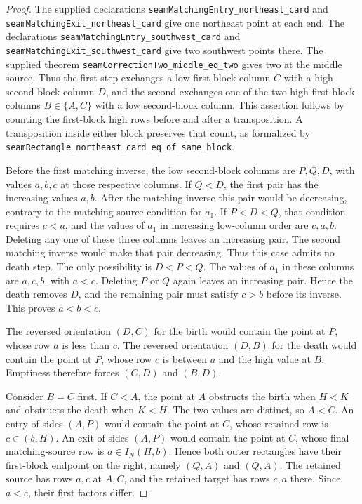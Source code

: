 \documentclass[11pt,oneside]{report}
\theoremstyle{definition}
\numberwithin{equation}{section}
\newcommand{\decl}[1]{\textnormal{\nolinkurl{#1}}}
\begin{document}
\begin{proof}
The supplied declarations \decl{seamMatchingEntry_northeast_card} and
\decl{seamMatchingExit_northeast_card} give one northeast point at
each end. The declarations \decl{seamMatchingEntry_southwest_card}
and \decl{seamMatchingExit_southwest_card} give two southwest
points there. The supplied theorem
\decl{seamCorrectionTwo_middle_eq_two} gives two at the middle source.
Thus the first step exchanges a low first-block column $C$ with a high
second-block column $D$, and the second exchanges one of the two high
first-block columns $B\in\{A,C\}$ with a low second-block column.
This assertion follows by counting the first-block high rows before
and after a transposition. A transposition inside either block preserves
that count, as formalized by
\decl{seamRectangle_northeast_card_eq_of_same_block}.

Before the first matching inverse, the low second-block columns are
$P,Q,D$, with values $a,b,c$ at those respective columns.
If $Q<D$, the first pair has the increasing values $a,b$. After the
matching inverse this pair would be decreasing, contrary to the
matching-source condition for $a_1$.
If $P<D<Q$, that condition requires $c<a$, and the values of $a_1$
in increasing low-column order are $c,a,b$. Deleting any one of these
three columns leaves an increasing pair. The second matching inverse
would make that pair decreasing. Thus this case admits no death step.
The only possibility is $D<P<Q$. The values of $a_1$ in these columns
are $a,c,b$, with $a<c$. Deleting $P$ or $Q$ again leaves an increasing
pair. Hence the death removes $D$, and the remaining pair must satisfy
$c>b$ before its inverse. This proves $a<b<c$.

The reversed orientation $(D,C)$ for the birth would contain the
point at $P$, whose row $a$ is less than $c$. The reversed orientation
$(D,B)$ for the death would contain the point at $P$, whose row $c$
is between $a$ and the high value at $B$. Emptiness therefore forces
$(C,D)$ and $(B,D)$.

Consider $B=C$ first. If $C<A$, the point at $A$ obstructs the birth
when $H<K$ and obstructs the death when $K<H$. The two values are
distinct, so $A<C$. An entry of sides $(A,P)$ would contain the point
at $C$, whose retained row is $c\in(b,H)$. An exit of sides $(A,P)$
would contain the point at $C$, whose final matching-source row is
$a\in I_N(H,b)$. Hence both outer rectangles have their first-block
endpoint on the right, namely $(Q,A)$ and $(Q,A)$. The retained source
has rows $a,c$ at $A,C$, and the retained target has rows $c,a$ there.
Since $a<c$, their first factors differ.


\end{proof}
\end{document}
